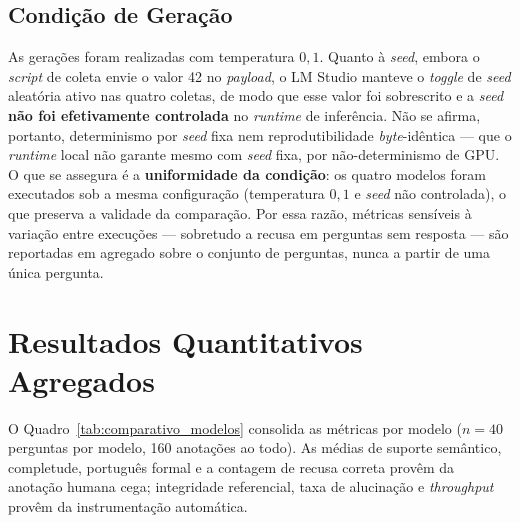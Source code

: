 \subsection{Condição de Geração}
As gerações foram realizadas com temperatura $0{,}1$. Quanto à \textit{seed}, embora o \textit{script} de coleta envie o valor 42 no \textit{payload}, o LM Studio manteve o \textit{toggle} de \textit{seed} aleatória ativo nas quatro coletas, de modo que esse valor foi sobrescrito e a \textit{seed} \textbf{não foi efetivamente controlada} no \textit{runtime} de inferência. Não se afirma, portanto, determinismo por \textit{seed} fixa nem reprodutibilidade \textit{byte}-idêntica --- que o \textit{runtime} local não garante mesmo com \textit{seed} fixa, por não-determinismo de GPU. O que se assegura é a \textbf{uniformidade da condição}: os quatro modelos foram executados sob a mesma configuração (temperatura $0{,}1$ e \textit{seed} não controlada), o que preserva a validade da comparação. Por essa razão, métricas sensíveis à variação entre execuções --- sobretudo a recusa em perguntas sem resposta --- são reportadas em agregado sobre o conjunto de perguntas, nunca a partir de uma única pergunta.

\section{Resultados Quantitativos Agregados}

O Quadro~\ref{tab:comparativo_modelos} consolida as métricas por modelo ($n = 40$ perguntas por modelo, 160 anotações ao todo). As médias de suporte semântico, completude, português formal e a contagem de recusa correta provêm da anotação humana cega; integridade referencial, taxa de alucinação e \textit{throughput} provêm da instrumentação automática.

\begin{quadro}[H]
    \centering
    \caption{Avaliação comparativa dos quatro modelos geradores ($n = 40$ por modelo; quantização Q4\_K\_M)}
    \label{tab:comparativo_modelos}
\end{quadro}


